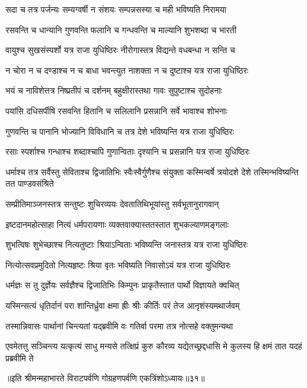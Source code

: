\twolineshloka
{सदा च तत्र पर्जन्यः सम्यग्वर्षी न संशयः}
{सम्पन्नसस्या च मही भविष्यति निरामया}


\twolineshloka
{रसवन्ति च धान्यानि गुणवन्ति फलानि च}
{गन्धवन्ति च माल्यानि शुभशब्दा च भारती}


\twolineshloka
{वायुश्च सुखसंस्पर्शो यत्र राजा युधिष्ठिरः}
{नीरोगास्तत्र विद्यन्ते वधबन्धा न सन्ति च}


\twolineshloka
{न चोरा न च दण्डाश्च न च बाधा भवन्त्युत}
{नाशक्ता न च दुष्टाश्च यत्र राजा युधिष्ठिरः}


\twolineshloka
{भयं च नाविशेत्तत्र निष्प्रतीपं च दर्शनम्}
{बहुक्षीरास्तथा गावः सुपुष्टाश्च सुदोहनाः}


\twolineshloka
{पयांसि दधिसर्पीषि रसवन्ति हितानि च}
{सलिलानि प्रसन्नानि सर्वे भावाश्च शोभनाः}


\twolineshloka
{गुणवन्ति च पानानि भोज्यानि विविधानि च}
{तत्र देशे भविष्यन्ति यत्र राजा युधिष्ठिरः}


\twolineshloka
{रसाः स्पर्शाश्च गन्धाश्च शब्दाश्चापि गुणान्विताः}
{दृश्यानि च प्रसन्नानि यत्र राजा युधिष्ठिरः}


\threelineshloka
{धर्माश्च तत्र सर्वैस्तु सेविताश्च द्विजातिभिः}
{स्वैःस्वैर्गुणैश्च संयुक्ता कस्मिन्वर्षे त्रयोदशे}
{देशे तस्मिन्भविष्यन्ति तत पाण्डवसंश्रिते}


\twolineshloka
{सम्प्रीतिमाञ्जनस्तत्र सन्तुष्टः शुचिरव्ययः}
{देवतातिथिभूयांस्तु सर्वभूतानुरागवान्}


\twolineshloka
{इष्टदानमहोत्साहा नित्यं धर्मपरायणाः}
{व्यक्तवाक्यास्ततस्तात शुभकल्याणमङ्गलाः}


\twolineshloka
{शुभत्विषः शुभेच्छाश्च नित्यतुष्टाः श्रियाऽन्विताः}
{भविष्यन्ति जनास्तत्र यत्र राजा युधिष्ठिरः}


\twolineshloka
{नित्योत्सवप्रमुदितो नित्यहृष्टः श्रिया वृतः}
{भविष्यति निवासोऽयं यत्र राजा युधिष्ठिरः}


\twolineshloka
{धर्मज्ञः स तु दुर्ज्ञेयः सर्वज्ञैश्च द्विजातिभिः}
{किम्पुनः प्राकृतैस्तात पार्थो विज्ञायते क्वचित्}


\twolineshloka
{यस्मिन्सत्यं धृतिर्दानं परा शान्तिर्ध्रुवा क्षमा}
{ह्रीः श्रीः कीर्तिः परं तेज आनृशंस्यमथार्जवम्}


\twolineshloka
{तस्मान्निवासः पार्थानां चिन्त्यतां यद्ब्रवीमि वः}
{गतिर्वा परमा तत्र नोत्सहे वक्तुमन्यथा}


\threelineshloka
{एवमेतत्तु सञ्चिन्त्य यत्कृत्यं साधु मन्यसे}
{तत्क्षिप्रं कुरु कौरव्य यद्येतच्छ्रद्दधासि मे}
{कुलस्य हि क्षमं तात यदहं प्रब्रवीमि ते}

॥इति श्रीमन्महाभारते विराटपर्वणि गोग्रहणपर्वणि एकत्रिंशोऽध्यायः॥३१॥

